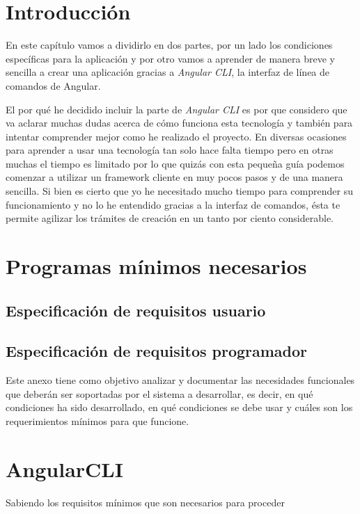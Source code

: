 
\section{Introducción}\label{introduccion-programador}
En este capítulo vamos a dividirlo en dos partes, por un lado los condiciones específicas para la aplicación y por otro vamos a aprender de manera breve y sencilla a crear una aplicación gracias a \emph{Angular CLI}, la interfaz de línea de comandos de Angular. 

El por qué he decidido incluir la parte de \emph{Angular CLI} es por que considero que va aclarar muchas dudas acerca de cómo funciona esta tecnología y también para intentar comprender mejor como he realizado el proyecto. En diversas ocasiones para aprender a usar una tecnología tan solo hace falta tiempo pero en otras muchas el tiempo es limitado por lo que quizás con esta pequeña guía podemos comenzar a utilizar un framework cliente en muy pocos pasos y de una manera sencilla. Si bien es cierto que yo he necesitado mucho tiempo para comprender su funcionamiento y no lo he entendido gracias a la interfaz de comandos, ésta te permite agilizar los trámites de creación en un tanto por ciento considerable.

\section{Programas mínimos necesarios}\label{angularCLI}


\subsection{Especificación de requisitos usuario}\label{espeficiaciones-requisitos-usuario}


\subsection{Especificación de requisitos programador}\label{espeficiaciones-requisitos-programador}


Este anexo tiene como objetivo analizar y documentar las necesidades funcionales que deberán ser soportadas por el sistema a desarrollar, es decir, en qué condiciones ha sido desarrollado, en qué condiciones se debe usar y cuáles son los requerimientos mínimos para que funcione.



\section{AngularCLI}\label{angularCLI}
Sabiendo los requisitos mínimos que son necesarios para proceder 

